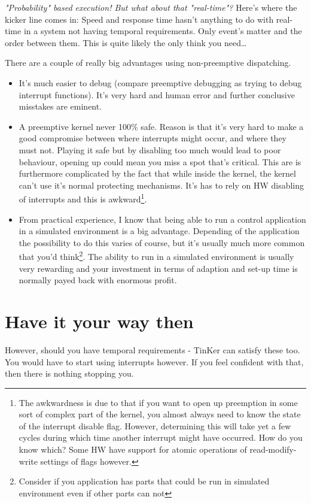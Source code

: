 \textit{\textit{"Probability"} based execution! But what about that \textit{"real-time"}?} Here's where the kicker line comes in: Speed and response time hasn't anything to do with real-time in a system not having temporal requirements. Only event's matter and the order between them. This is quite likely the only think you need\ldots

There are a couple of really big advantages using non-preemptive dispatching.
\begin{itemize}
	\item It's much easier to debug (compare preemptive debugging as trying to debug interrupt functions). It's very hard and human error and further conclusive misstakes are eminent.
	\item A preemptive kernel never 100\% safe. Reason is that it's very hard to make a good compromise between where interrupts might occur, and where they must not. Playing it safe but by disabling too much would lead to poor behaviour, opening up could mean you miss a spot that's critical. This are is furthermore complicated by the fact that while inside the kernel, the kernel can't use it's normal protecting mechanisms. It's has to rely on HW disabling of interrupts and this is awkward\footnote{The awkwardness is due to that if you want to open up preemption in some sort of complex part of the kernel, you almost always need to know the state of the interrupt disable flag. However, determining this will take yet a few cycles during which time another interrupt might have occurred. How do you know which? Some HW have support for atomic operations of read-modify-write settings of flags however.}.
	\item From practical experience, I know that being able to run a control application in a simulated environment is a big advantage. Depending of the application the possibility to do this varies of course, but it's usually much more common that you'd think\footnote{Consider if you application has parts that could be run in simulated environment even if other parts can not}. The ability to run in a simulated environment is usually very rewarding and your investment in terms of adaption and set-up time is normally payed back with enormous profit.
\end{itemize}

\section{Have it your way then}
However, should you have temporal requirements - TinKer can satisfy these too. You would have to start using interrupts however. If you feel confident with that, then there is nothing stopping you.

